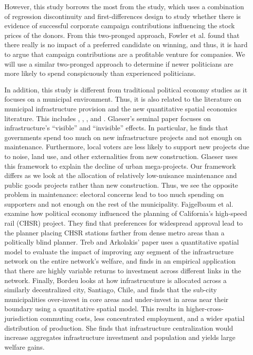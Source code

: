 However, this study borrows the most from the \cite{fowleretalquidproquo} study, which uses a combination of regression discontinuity and first-differences design to study whether there is evidence of successful corporate campaign contributions influencing the stock prices of the donors. 
From this two-pronged approach, Fowler et al. found that there really is no impact of a preferred candidate on winning, and thus, it is hard to argue that campaign contributions are a profitable venture for companies. 
We will use a similar two-pronged approach to determine if newer politicians are more likely to spend conspicuously than experienced politicians. 

In addition, this study is different from traditional political economy studies as it focuses on a municipal environment. 
Thus, it is also related to the literature on municipal infrastructure provision and the new quantitative spatial economics literature.
This includes \cite{Glaeser2018political}, \cite{Fajgelbaum2023}, \cite{treb_arkolakis_2022_infrastructure}, and \cite{bordeu2023commuting}.
Glaeser's seminal paper focuses on infrastructure's ``visible'' and ``invisible'' effects. 
In particular, he finds that governments spend too much on new infrastructure projects and not enough on maintenance.
Furthermore, local voters are less likely to support new projects due to noise, land use, and other externalities from new construction.
Glaeser uses this framework to explain the decline of urban mega-projects.
Our framework differs as we look at the allocation of relatively low-nuisance maintenance and public goods projects rather than new construction.
Thus, we see the opposite problem in maintenance: electoral concerns lead to too much spending on supporters and not enough on the rest of the municipality.
Fajgelbaum et al. examine how political economy influenced the planning of California's high-speed rail (CHSR) project.
They find that preferences for widespread approval lead to the planner placing CHSR stations farther from dense metro areas than a politically blind planner.
Treb and Arkolakis' paper uses a quantitative spatial model to evaluate the impact of improving any segment of the infrastructure network on the entire network's welfare, and finds in an empirical application that there are highly variable returns to investment across different links in the network.
Finally, Bordeu looks at how infrastrucuture is allocated across a similarly decentralized city, Santiago, Chile, and finds that the sub-city municipalities over-invest in core areas and under-invest in areas near their boundary using a quantitative spatial model.
This results in higher-cross-jurisdiction commuting costs, less concentrated employment, and a wider spatial distribution of production.
She finds that infrastructure centralization would increase aggregates infrastructure investment and population and yields large welfare gains.
